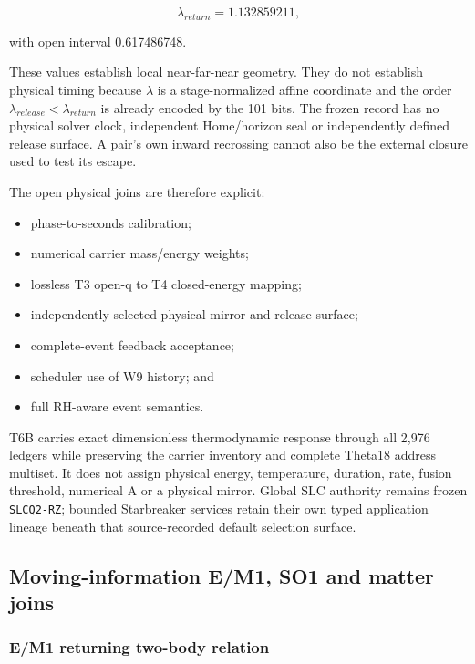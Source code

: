 \[
\lambda_{return}=1.132859211,
\]

with open interval 0.617486748.

These values establish local near-far-near geometry. They do not
establish physical timing because \(\lambda\) is a stage-normalized
affine coordinate and the order \(\lambda_{release}<\lambda_{return}\)
is already encoded by the 101 bits. The frozen record has no physical
solver clock, independent Home/horizon seal or independently defined
release surface. A pair's own inward recrossing cannot also be the
external closure used to test its escape.

The open physical joins are therefore explicit:

\begin{itemize}
\tightlist
\item
  phase-to-seconds calibration;
\item
  numerical carrier mass/energy weights;
\item
  lossless T3 open-q to T4 closed-energy mapping;
\item
  independently selected physical mirror and release surface;
\item
  complete-event feedback acceptance;
\item
  scheduler use of W9 history; and
\item
  full RH-aware event semantics.
\end{itemize}

T6B carries exact dimensionless thermodynamic response through all 2,976
ledgers while preserving the carrier inventory and complete Theta18
address multiset. It does not assign physical energy, temperature,
duration, rate, fusion threshold, numerical A or a physical mirror.
Global SLC authority remains frozen \texttt{SLCQ2-RZ}; bounded
Starbreaker services retain their own typed application lineage beneath
that source-recorded default selection surface.

\subsection{Moving-information E/M1, SO1 and matter
joins}\label{viii-ch08-moving-information-em1-so1-and-matter-joins}

\subsubsection{E/M1 returning two-body
relation}\label{viii-ch08-em1-returning-two-body-relation}

